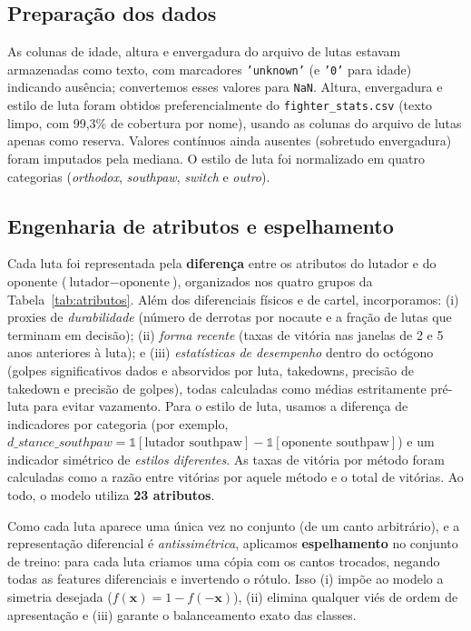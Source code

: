 \documentclass[10pt]{article}
\begin{document}
\subsection{Preparação dos dados}
As colunas de idade, altura e envergadura do arquivo de lutas estavam
armazenadas como texto, com marcadores \texttt{'unknown'} (e \texttt{'0'} para
idade) indicando ausência; convertemos esses valores para \texttt{NaN}. Altura,
envergadura e estilo de luta foram obtidos preferencialmente do
\texttt{fighter\_stats.csv} (texto limpo, com 99,3\% de cobertura por nome),
usando as colunas do arquivo de lutas apenas como reserva. Valores contínuos
ainda ausentes (sobretudo envergadura) foram imputados pela mediana. O estilo de
luta foi normalizado em quatro categorias (\emph{orthodox}, \emph{southpaw},
\emph{switch} e \emph{outro}).

\subsection{Engenharia de atributos e espelhamento}
Cada luta foi representada pela \textbf{diferença} entre os atributos do lutador
e do oponente ($\text{lutador} - \text{oponente}$), organizados nos quatro
grupos da Tabela~\ref{tab:atributos}. Além dos diferenciais físicos e de cartel,
incorporamos: (i) proxies de \emph{durabilidade} (número de derrotas por
nocaute e a fração de lutas que terminam em decisão); (ii) \emph{forma recente}
(taxas de vitória nas janelas de 2 e 5 anos anteriores à luta); e
(iii) \emph{estatísticas de desempenho} dentro do octógono (golpes
significativos dados e absorvidos por luta, takedowns, precisão de takedown e
precisão de golpes), todas calculadas como médias estritamente pré-luta para
evitar vazamento. Para o estilo de luta, usamos a diferença de indicadores por
categoria (por exemplo,
$d\_stance\_southpaw = \mathbb{1}[\text{lutador southpaw}] -
\mathbb{1}[\text{oponente southpaw}]$) e um indicador simétrico de
\emph{estilos diferentes}. As taxas de vitória por método foram calculadas como
a razão entre vitórias por aquele método e o total de vitórias. Ao todo, o
modelo utiliza \textbf{23 atributos}.

Como cada luta aparece uma única vez no conjunto (de um canto arbitrário), e a
representação diferencial é \emph{antissimétrica}, aplicamos
\textbf{espelhamento} no conjunto de treino: para cada luta criamos uma cópia
com os cantos trocados, negando todas as features diferenciais e invertendo o
rótulo. Isso (i) impõe ao modelo a simetria desejada
($f(\mathbf{x}) = 1 - f(-\mathbf{x})$), (ii) elimina qualquer viés de ordem de
apresentação e (iii) garante o balanceamento exato das classes.
\end{document}
